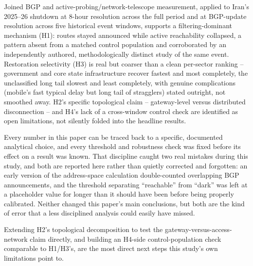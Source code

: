 Joined BGP and active-probing/network-telescope measurement, applied to
Iran's 2025--26 shutdown at 8-hour resolution across the full period and at
BGP-update resolution across five historical event windows, supports a
filtering-dominant mechanism (H1): routes stayed announced while active
reachability collapsed, a pattern absent from a matched control population
and corroborated by an independently authored, methodologically distinct
study of the same event. Restoration selectivity (H3) is real but coarser
than a clean per-sector ranking -- government and core state infrastructure
recover fastest and most completely, the unclassified long tail slowest and
least completely, with genuine complications (mobile's fast typical delay
but long tail of stragglers) stated outright, not smoothed away. H2's specific
topological claim -- gateway-level versus distributed disconnection -- and
H4's lack of a cross-window control check are identified as open
limitations, not silently folded into the headline results.

Every number in this paper can be traced back to a specific, documented
analytical choice, and every threshold and robustness check was fixed
before its effect on a result was known. That discipline caught two real
mistakes during this study, and both are reported here rather than quietly
corrected and forgotten: an early version of the address-space calculation
double-counted overlapping BGP announcements, and the threshold separating
``reachable'' from ``dark'' was left at a placeholder value for longer than it
should have been before being properly calibrated. Neither changed this
paper's main conclusions, but both are the kind of error that a less
disciplined analysis could easily have missed.

Extending H2's topological decomposition to test the
gateway-versus-access-network claim directly, and building an H4-side
control-population check comparable to H1/H3's, are the most direct next
steps this study's own limitations point to.
